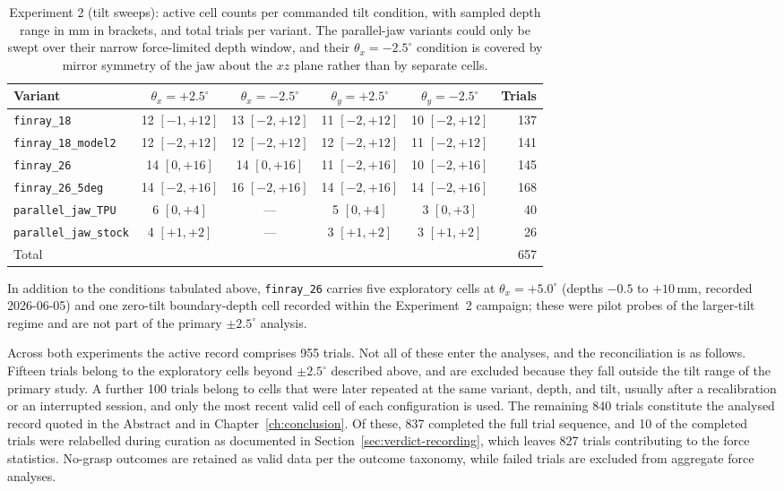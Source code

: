 \begin{table}[ht]
\centering
\caption[Experiment 2 coverage]{Experiment 2 (tilt sweeps): active cell
counts per commanded tilt condition, with sampled depth range in mm in
brackets, and total trials per variant. The parallel-jaw variants could
only be swept over their narrow force-limited depth window, and their
$\theta_x = -2.5^{\circ}$ condition is covered by mirror symmetry of the
jaw about the $xz$ plane rather than by separate cells.}
\label{tab:coverage-exp2}
\footnotesize
\begin{tabular}{lccccr}
\toprule
Variant & $\theta_x{=}{+}2.5^{\circ}$ & $\theta_x{=}{-}2.5^{\circ}$
        & $\theta_y{=}{+}2.5^{\circ}$ & $\theta_y{=}{-}2.5^{\circ}$ & Trials \\
\midrule
\texttt{finray\_18}          & 12 $[-1,+12]$ & 13 $[-2,+12]$ & 11 $[-2,+12]$ & 10 $[-2,+12]$ & 137 \\
\texttt{finray\_18\_model2}  & 12 $[-2,+12]$ & 12 $[-2,+12]$ & 12 $[-2,+12]$ & 11 $[-2,+12]$ & 141 \\
\texttt{finray\_26}          & 14 $[0,+16]$ & 14 $[0,+16]$ & 11 $[-2,+16]$ & 10 $[-2,+16]$ & 145 \\
\texttt{finray\_26\_5deg}    & 14 $[-2,+16]$ & 16 $[-2,+16]$ & 14 $[-2,+16]$ & 14 $[-2,+16]$ & 168 \\
\texttt{parallel\_jaw\_TPU}  &  6 $[0,+4]$  & ---           &  5 $[0,+4]$  &  3 $[0,+3]$  & 40 \\
\texttt{parallel\_jaw\_stock}&  4 $[+1,+2]$  & ---           &  3 $[+1,+2]$  &  3 $[+1,+2]$  & 26 \\
\midrule
Total                        &               &               &               &               & 657 \\
\bottomrule
\end{tabular}
\end{table}

In addition to the conditions tabulated above, \texttt{finray\_26} carries
five exploratory cells at $\theta_x = +5.0^{\circ}$ (depths $-0.5$ to
$+10$\,mm, recorded 2026-06-05) and one zero-tilt boundary-depth cell
recorded within the Experiment~2 campaign; these were pilot probes of the
larger-tilt regime and are not part of the primary $\pm 2.5^{\circ}$
analysis.

Across both experiments the active record comprises 955 trials. Not all
of these enter the analyses, and the reconciliation is as follows. Fifteen
trials belong to the exploratory cells beyond $\pm 2.5^{\circ}$ described
above, and are excluded because they fall outside the tilt range of the
primary study. A further 100 trials belong to cells that were later
repeated at the same variant, depth, and tilt, usually after a
recalibration or an interrupted session, and only the most recent valid
cell of each configuration is used. The remaining 840 trials constitute
the analysed record quoted in the Abstract and in
Chapter~\ref{ch:conclusion}. Of these, 837 completed the full trial
sequence, and 10 of the completed trials were relabelled during curation
as documented in Section~\ref{sec:verdict-recording}, which leaves 827
trials contributing to the force statistics. No-grasp outcomes are
retained as valid data per the outcome taxonomy, while failed trials are
excluded from aggregate force analyses.
